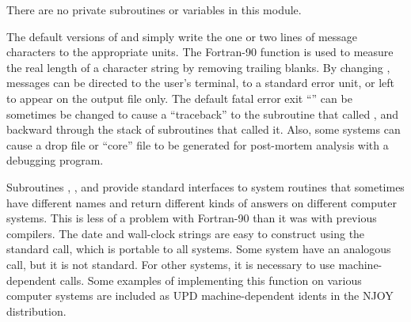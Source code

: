 \noindent
There are no private subroutines or variables in this module.

The default versions of  and  simply write
the one or two lines of message characters to the appropriate units.
The Fortran-90  function is used to measure the real
length of a character string by removing trailing blanks.  By
changing , messages can be directed to the user's
terminal, to a standard error unit, or left to appear on the output
file only.  The default fatal error exit ``'' can be
sometimes be changed to cause a ``traceback'' to the subroutine that
called , and backward through the stack of subroutines that
called it.  Also, some systems can cause a drop file or ``core'' file to
be generated for post-mortem analysis with a debugging program.

Subroutines , , and 
provide standard interfaces to system routines that sometimes have
different names and return different kinds of answers on different
computer systems.  This is less of a problem with Fortran-90 than
it was with previous compilers.  The date and wall-clock strings
are easy to construct using the standard  call,
which is portable to all systems.   Some system have an analogous
 call, but it is not standard.  For other systems,
it is necessary to use machine-dependent calls. Some examples of
implementing this function on various computer systems are included
as UPD machine-dependent idents in the NJOY distribution.

